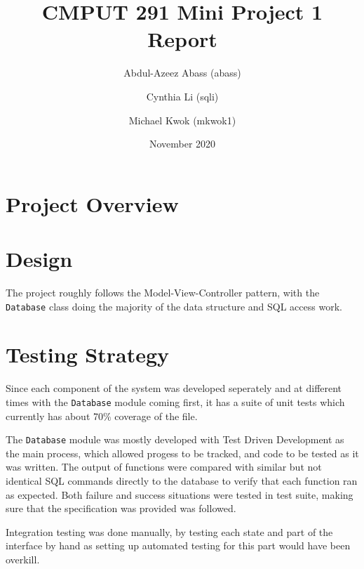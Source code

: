 \documentclass{article}
\title{CMPUT 291 Mini Project 1 Report}
\date{November 2020}
\author{Abdul-Azeez Abass (abass)\\
\and Cynthia Li (sqli)\\
\and Michael Kwok (mkwok1)}
\begin{document}
\maketitle

\section{Project Overview}

\section{Design}

The project roughly follows the Model-View-Controller pattern, with the \verb|Database| class doing the majority of the data structure and SQL access work.


\section{Testing Strategy}
Since each component of the system was developed seperately and at different times with the \verb|Database| module coming first, it has a suite of unit tests which currently has about 70\% coverage of the file.

The \verb|Database| module was mostly developed with Test Driven Development as the main process, which allowed progess to be tracked, and code to be tested as it was written. The output of functions were compared with similar but not identical SQL commands directly to the database to verify that each function ran as expected. Both failure and success situations were tested in test suite, making sure that the specification was provided was followed.

Integration testing was done manually, by testing each state and part of the interface by hand as setting up automated testing for this part would have been overkill.

\end{document}
